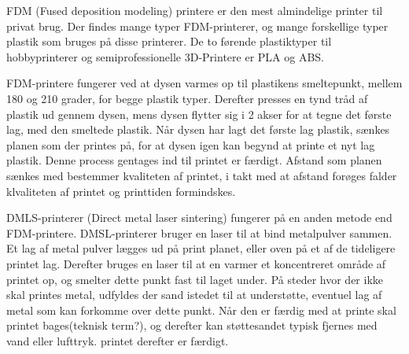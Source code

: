 FDM (Fused deposition modeling) printere er den mest almindelige printer til privat brug. Der findes mange typer FDM-printerer, og mange forskellige typer plastik som bruges på disse printerer. De to førende plastiktyper til hobbyprinterer og semiprofessionelle 3D-Printere er PLA og ABS.\autocite{3d-guide:_????} 

FDM-printere fungerer ved at dysen varmes op til plastikens smeltepunkt, mellem 180 og 210 grader, for begge plastik typer. Derefter presses en tynd tråd af plastik ud gennem dysen, mens dysen flytter sig i 2 akser for at tegne det første lag, med den smeltede plastik. 
Når dysen har lagt det første lag plastik, sænkes planen som der printes på, for at dysen igen kan begynd at printe et nyt lag plastik. Denne process gentages ind til printet er færdigt. 
Afstand som planen sænkes med bestemmer kvaliteten af printet, i takt med at afstand forøges falder klvaliteten af printet og printtiden formindskes.


DMLS-printerer (Direct metal laser sintering) fungerer på en anden metode end FDM-printere. DMSL-printerer bruger en laser til at bind metalpulver sammen. Et lag af metal pulver lægges ud på print planet, eller oven på et af de tideligere printet lag. Derefter bruges en laser til at en varmer et koncentreret område af printet op, og smelter dette punkt fast til laget under. På steder hvor der ikke skal printes metal, udfyldes der sand istedet til at understøtte, eventuel lag af metal som kan forkomme over dette punkt.\autocite{manyika_disruptive_2013}
Når den er færdig med at printe skal printet bages(teknisk term?), og derefter kan støttesandet typisk fjernes med vand eller lufttryk. printet derefter er færdigt.\autocite{manyika_disruptive_2013}
\newpage



